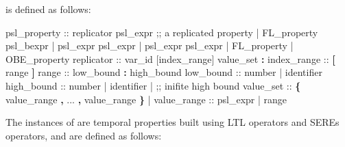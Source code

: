  is defined as follows:
%
\begin{Grammar}
psl_property :: 
   replicator psl_expr ;; a replicated property 
 | FL_property  psl_bexpr
 | psl_expr \operator{<->} psl_expr
 | psl_expr \operator{->} psl_expr
 | FL_property       
 | OBE_property      
replicator :: 
    var_id [index_range]  value_set \textbf{:} 
index_range :: 
   \textbf{[} range \textbf{]} 
range :: 
   low_bound \textbf{:} high_bound 
low_bound :: 
   number              
 | identifier         
high_bound :: 
   number 
 | identifier
 |              ;; inifite high bound 
value_set :: 
   \textbf{\{} value_range \textbf{,} ... \textbf{,} value_range \textbf{\}}
 | 
value_range :: 
   psl_expr
 | range
\end{Grammar}
%
The instances of  are temporal properties built
using LTL operators and SEREs operators, and are defined as follows:
%

